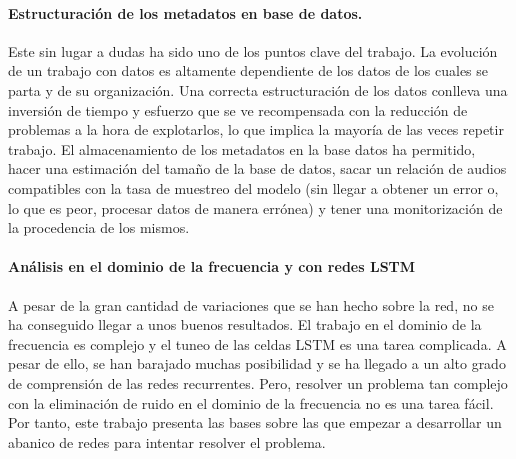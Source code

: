 \paragraph{Estructuración de los metadatos en base de datos.} Este sin lugar a dudas ha sido uno de los puntos clave del trabajo. La evolución de un trabajo con datos es altamente dependiente de los datos de los cuales se parta y de su organización. Una correcta estructuración de los datos conlleva una inversión de tiempo y esfuerzo que se ve recompensada con la reducción de problemas a la hora de explotarlos, lo que implica la mayoría de las veces repetir trabajo. El almacenamiento de los metadatos en la base datos ha permitido, hacer una estimación del tamaño de la base de datos, sacar un relación de audios compatibles con la tasa de muestreo del modelo (sin llegar a obtener un error o, lo que es peor, procesar datos de manera errónea) y tener una monitorización de la procedencia de los mismos.

\paragraph{Análisis en el dominio de la frecuencia y con redes \gls{LSTM}}
A pesar de la gran cantidad de variaciones que se han hecho sobre la red, no se ha conseguido llegar a unos buenos resultados. El trabajo en el dominio de la frecuencia es complejo y el tuneo de las celdas \gls{LSTM} es una tarea complicada. A pesar de ello, se han barajado muchas posibilidad y se ha llegado a un alto grado de comprensión de las redes recurrentes. Pero, resolver un problema tan complejo con la eliminación de ruido en el dominio de la frecuencia no es una tarea fácil. Por tanto, este trabajo presenta las bases sobre las que empezar a desarrollar un abanico de redes para intentar resolver el problema.


